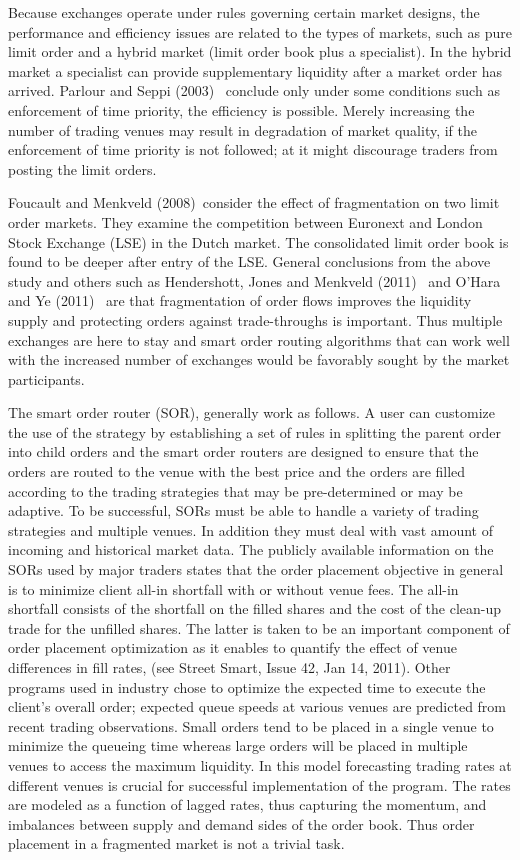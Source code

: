 Because exchanges operate under rules governing certain market designs, the performance and efficiency issues are related to the types of markets, such as pure limit order and a hybrid market (limit order book plus a specialist). In the hybrid market a specialist can provide supplementary liquidity after a market order has arrived. Parlour and Seppi (2003)~\cite{parlour2003} conclude only under some conditions such as enforcement of time priority, the efficiency is possible. Merely increasing the number of trading venues may result in degradation of market quality, if the enforcement of time priority is not followed; at it might discourage traders from posting the limit orders.


Foucault and Menkveld (2008)~\cite{foumen}consider the effect of fragmentation on two limit order markets. They examine the competition between Euronext and London Stock Exchange (LSE) in the Dutch market. The consolidated limit order book is found to be deeper after entry of the LSE. General conclusions from the above study and others such as Hendershott, Jones and Menkveld (2011)~\cite{hjm} and O'Hara and Ye (2011)~\cite{oye} are that fragmentation of order flows improves the liquidity supply and protecting orders against trade-throughs is important. Thus multiple exchanges are here to stay and smart order routing algorithms that can work well with the increased number of exchanges would be favorably sought by the market participants.


The smart order router (SOR), generally work as follows. A user can customize the use of the strategy by establishing a set of rules in splitting the parent order into child orders and the smart order routers are designed to ensure that the orders are routed to the venue with the best price and the orders are filled according to the trading strategies that may be pre-determined or may be adaptive. To be successful, SORs must be able to handle a variety of trading strategies and multiple venues. In addition they must deal with vast amount of incoming and historical market data. The publicly available information on the SORs used by major traders states that the order placement objective in general is to minimize client all-in shortfall with or without venue fees. The all-in shortfall consists of the shortfall on the filled shares and the cost of the clean-up trade for the unfilled shares. The latter is taken to be an important component of order placement optimization as it enables to quantify the effect of venue differences in fill rates, (see Street Smart, Issue 42, Jan 14, 2011). Other programs used in industry chose to optimize the expected time to execute the client's overall order; expected queue speeds at various venues are predicted from recent trading observations. Small orders tend to be placed in a single venue to minimize the queueing time whereas large orders will be placed in multiple venues to access the maximum liquidity. In this model forecasting trading rates at different venues is crucial for successful implementation of the program. The rates are modeled as a function of lagged rates, thus capturing the momentum, and imbalances between supply and demand sides of the order book. Thus order placement in a fragmented market is not a trivial task.


